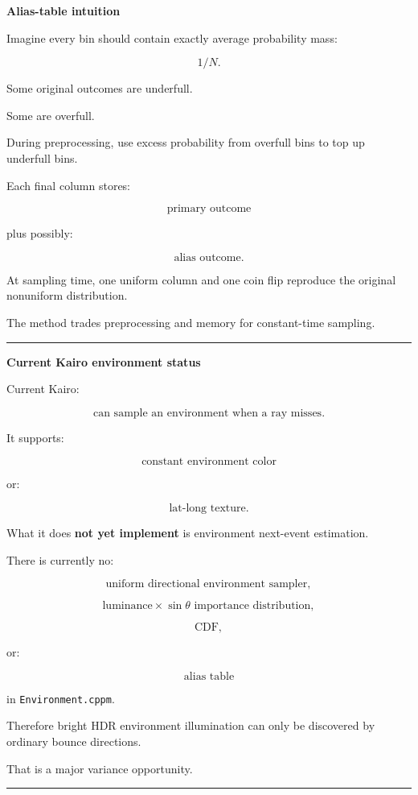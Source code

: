 \textbf{Alias-table intuition}

Imagine every bin should contain exactly average probability mass:

\[
1/N.
\]

Some original outcomes are underfull.

Some are overfull.

During preprocessing, use excess probability from overfull bins to top up underfull bins.

Each final column stores:

\[
\text{primary outcome}
\]

plus possibly:

\[
\text{alias outcome}.
\]

At sampling time, one uniform column and one coin flip reproduce the original nonuniform distribution.

The method trades preprocessing and memory for constant-time sampling.

\begin{center}\rule{0.5\linewidth}{0.5pt}\end{center}

\textbf{Current Kairo environment status}

Current Kairo:

\[
\text{can sample an environment when a ray misses}.
\]

It supports:

\[
\text{constant environment color}
\]

or:

\[
\text{lat-long texture}.
\]

What it does \textbf{not yet implement} is environment next-event estimation.

There is currently no:

\[
\text{uniform directional environment sampler},
\]

\[
\text{luminance}\times\sin\theta\text{ importance distribution},
\]

\[
\text{CDF},
\]

or:

\[
\text{alias table}
\]

in \texttt{Environment.cppm}.

Therefore bright HDR environment illumination can only be discovered by ordinary bounce directions.

That is a major variance opportunity.

\begin{center}\rule{0.5\linewidth}{0.5pt}\end{center}


